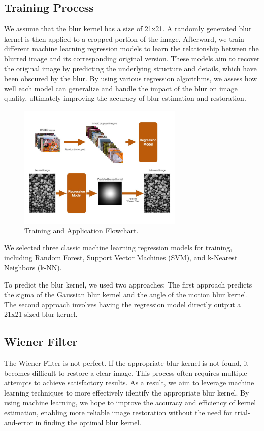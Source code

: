 \documentclass[twoside,11pt]{article}
\begin{document}
\subsection{Training Process}
We assume that the blur kernel has a size of 21x21. A randomly generated blur kernel is then applied to a cropped portion of the image. Afterward, we train different machine learning regression models to learn the relationship between the blurred image and its corresponding original version. These models aim to recover the original image by predicting the underlying structure and details, which have been obscured by the blur. By using various regression algorithms, we assess how well each model can generalize and handle the impact of the blur on image quality, ultimately improving the accuracy of blur estimation and restoration.

\begin{figure}[H]
\centering
\includegraphics[width=0.7\textwidth]{figure6.jpg}
\caption{Training and Application Flowchart.}
\end{figure}

We selected three classic machine learning regression models for training, including Random Forest, Support Vector Machines (SVM), and k-Nearest Neighbors (k-NN).

To predict the blur kernel, we used two approaches: The first approach predicts the sigma of the Gaussian blur kernel and the angle of the motion blur kernel. The second approach involves having the regression model directly output a 21x21-sized blur kernel.

\subsection{Wiener Filter}
The Wiener Filter is not perfect. If the appropriate blur kernel is not found, it becomes difficult to restore a clear image. This process often requires multiple attempts to achieve satisfactory results. As a result, we aim to leverage machine learning techniques to more effectively identify the appropriate blur kernel. By using machine learning, we hope to improve the accuracy and efficiency of kernel estimation, enabling more reliable image restoration without the need for trial-and-error in finding the optimal blur kernel.
\end{document}

